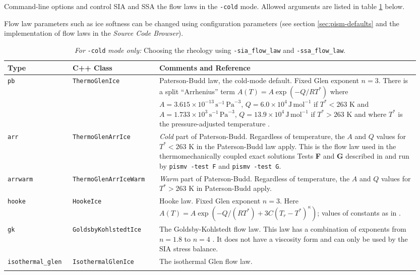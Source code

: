 Command-line options  and  control SIA and SSA the flow laws in the \texttt{-cold} mode.  Allowed arguments are listed in table \ref{tab:flowlaw} below.

Flow law parameters such as ice softness can be changed using configuration parameters (see section \ref{sec:pism-defaults} and the implementation of flow laws in the \emph{Source Code Browser}).

\begin{table}[ht]
\centering
{}
\small
\begin{tabular}{p{0.15\linewidth}p{0.2\linewidth}p{0.6\linewidth}}\toprule
\textbf{Type} & C++ Class & \textbf{Comments and Reference} \\ \midrule
\texttt{pb} &\texttt{ThermoGlenIce}  & Paterson-Budd law, the cold-mode default.  Fixed Glen exponent $n=3$.  There is a split ``Arrhenius'' term $A(T) = A \exp(-Q/RT^*)$ where \mbox{$A = 3.615 \times 10^{-13}\, \text{s}^{-1}\, \text{Pa}^{-3}$}, \mbox{$Q = 6.0 \times 10^4\, \text{J}\, \text{mol}^{-1}$} if $T^* < 263$ K and
 \mbox{$A = 1.733 \times 10^{3}\, \text{s}^{-1}\, \text{Pa}^{-3}$}, \mbox{$Q = 13.9 \times 10^4\, \text{J}\, \text{mol}^{-1}$} if $T^* > 263$ K and where $T^*$ is the pressure-adjusted temperature \cite{PatersonBudd}. \\
\texttt{arr} &  \texttt{ThermoGlenArrIce} & \emph{Cold} part of Paterson-Budd.  Regardless of temperature, the $A$ and $Q$ values for $T^*<263$ K in  the Paterson-Budd law apply.  This is the flow law used in the thermomechanically coupled exact solutions Tests \textbf{F} and \textbf{G} described in \cite{BBL,BB} and run by \texttt{pismv -test F} and \texttt{pismv -test G}. \\
\texttt{arrwarm} & \texttt{ThermoGlenArrIceWarm} & \emph{Warm} part of Paterson-Budd.  Regardless of temperature, the $A$ and $Q$ values for $T^*>263$ K in Paterson-Budd apply.\\
\texttt{hooke} & \texttt{HookeIce} & Hooke law.  Fixed Glen exponent $n=3$.  Here  \mbox{$A(T) = A \exp(-Q/(RT^*) + 3C (T_r - T^*)^\kappa)$;} values of  constants as in \cite{Hooke,PayneBaldwin}.\\
\texttt{gk} & \texttt{GoldsbyKohlstedtIce} & The  Goldsby-Kohlstedt flow law.  This law has a combination of exponents  from $n=1.8$ to $n=4$ \cite{GoldsbyKohlstedt}. It does not have a viscosity form and can only be used by the SIA stress balance. \\
\texttt{isothermal_glen} &  \texttt{IsothermalGlenIce} &The isothermal Glen flow law. \\
\bottomrule
\normalsize	
\end{tabular}
\caption{\emph{For} \texttt{-cold} \emph{mode only:} Choosing the rheology using \texttt{-sia_flow_law} and \texttt{-ssa_flow_law}.}
\label{tab:flowlaw}
\end{table}


